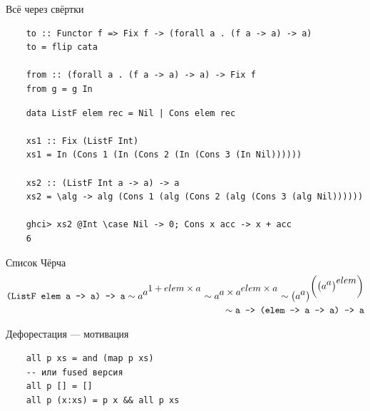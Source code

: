 
    \begin{frame}[fragile]{Всё через свёртки}
        \pause
        \begin{verbatim}
    to :: Functor f => Fix f -> (forall a . (f a -> a) -> a)
    to = flip cata

    from :: (forall a . (f a -> a) -> a) -> Fix f
    from g = g In
        \end{verbatim}
        \pause\vspace{1em}
        \begin{verbatim}
    data ListF elem rec = Nil | Cons elem rec

    xs1 :: Fix (ListF Int)
    xs1 = In (Cons 1 (In (Cons 2 (In (Cons 3 (In Nil))))))

    xs2 :: (ListF Int a -> a) -> a
    xs2 = \alg -> alg (Cons 1 (alg (Cons 2 (alg (Cons 3 (alg Nil))))))

    ghci> xs2 @Int \case Nil -> 0; Cons x acc -> x + acc
    6
        \end{verbatim}
    \end{frame}

    \begin{frame}[fragile]{Список Чёрча}
        \pause
        \begin{align*}
            \text{\texttt{(ListF elem a -> a) -> a}}
            \sim a^{\displaystyle a^{\displaystyle 1 + elem\times a}}
            \sim a^{\displaystyle a\times a^{\displaystyle elem\times a}}
            \sim \left( a^{\displaystyle a} \right)^{\displaystyle \left(\left( a^{\displaystyle a}\right)^{\displaystyle elem}\right)} \\
            \sim \text{\texttt{a -> (elem -> a -> a) -> a}}
        \end{align*}
    \end{frame}

    \begin{frame}[fragile]{Дефорестация --- мотивация}
        \pause
        \begin{verbatim}
    all p xs = and (map p xs)
    -- или fused версия
    all p [] = []
    all p (x:xs) = p x && all p xs
        \end{verbatim}
    \end{frame}

